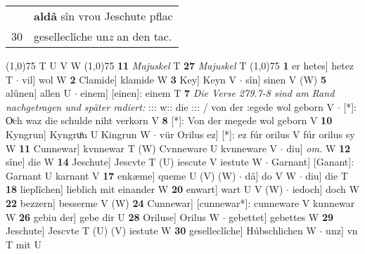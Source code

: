 \documentclass[8pt,a4paper,notitlepage]{article}
\begin{document}
\begin{table}[ht]
\begin{minipage}[t]{0.5\linewidth}
\begin{tabular}{rl}
 & \textbf{aldâ} sîn vrou Jeschute pflac\\ 
30 & geselleclîche un\textit{z} an den tac.\\ 
\end{tabular}
\scriptsize
\line(1,0){75} \newline
T U V W \newline
\line(1,0){75} \newline
\textbf{11} \textit{Majuskel} T  \textbf{27} \textit{Majuskel} T  \newline
\line(1,0){75} \newline
\textbf{1} er hetes] hetez T  $\cdot$ vil] wol W \textbf{2} Clamide] klamide W \textbf{3} Key] Keyn V  $\cdot$ sîn] sinen V (W) \textbf{5} alûnen] allen U  $\cdot$ einem] [einen]: einem T \textbf{7} \textit{Die Verse 279.7-8 sind am Rand nachgetragen und später radiert:} ::: w:: die ::: / von der :egede wol geborn V   $\cdot$ [*]: Oͮch waz die schulde niht verkorn V \textbf{8} [*]: Von der megede wol geborn V \textbf{10} Kyngrun] Kyngruͦn U Kingrun W  $\cdot$ vür Orilus ez] [*]: ez fúr orilus V fúr orilus sy W \textbf{11} Cunnewar] kvnnewar T (W) Cvnneware U kvnneware V  $\cdot$ diu] \textit{om.} W \textbf{12} sîne] die W \textbf{14} Jeschute] Jescvte T (U) iescute V iestute W  $\cdot$ Garnant] [Ganant]: Garnant U karnant V \textbf{17} enkæme] queme U (V) (W)  $\cdot$ dâ] do V W  $\cdot$ diu] die T \textbf{18} lieplîchen] lieblich mit einander W \textbf{20} enwart] wart U V (W)  $\cdot$ iedoch] doch W \textbf{22} bezzern] besserme V (W) \textbf{24} Cunnewar] [cunnewar*]: cunneware V kunnewar W \textbf{26} gebiu der] gebe dir U \textbf{28} Oriluse] Orilus W  $\cdot$ gebettet] gebettes W \textbf{29} Jeschute] Jescvte T (U) (V) iestute W \textbf{30} geselleclîche] Húbschlichen W  $\cdot$ unz] vn T mit U \newline
\end{minipage}
\end{table}
\end{document}
